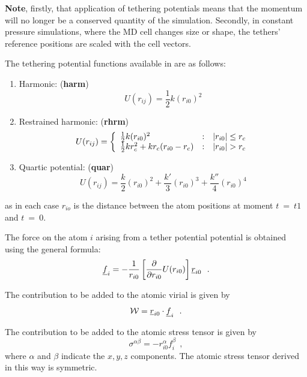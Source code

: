 {\bf Note}, firstly, that application of tethering potentials means that
the momentum will no longer be a conserved quantity of the
simulation.  Secondly, in constant pressure simulations, where the
MD cell changes size or shape, the tethers' reference positions
are scaled with the cell vectors.

The tethering potential functions available in \D are as follows:
\begin{enumerate}
\item Harmonic:  ({\bf harm})
\begin{equation}
U(r_{ij}) = \frac{1}{2}k(r_{i0})^{2}
\end{equation}
\item Restrained harmonic:  ({\bf rhrm})
\begin{equation}
U(r_{ij}) = \left\{ \begin{array} {l@{\quad:\quad}l}
\frac{1}{2}k(r_{i0})^{2} & |r_{i0}| \le r_{c} \\
\frac{1}{2}kr_{c}^{2} + kr_{c}(r_{i0}-r_{c}) & |r_{i0}| > r_{c}
\end{array} \right.
\end{equation}
\item Quartic potential:  ({\bf quar})
\begin{equation}
U(r_{ij}) =
\frac{k}{2}(r_{i0})^{2}+\frac{k'}{3}(r_{i0})^{3}+\frac{k''}{4}(r_{i0})^{4}
\end{equation}
\end{enumerate}
as in each case $r_{io}$ is the distance between the atom
positions at moment $t~=~t1$ and $t~=~0$.

The force on the atom $i$ arising from a tether potential
potential is obtained using the general
formula:
\begin{equation}
\mbox{$\underline{f}$}_{i} = -\frac{1}{{r}_{i0}}\left[ \frac{\partial }{\partial
r_{i0}}U(r_{i0})\right]\mbox{$\underline{r}$}_{i0}~~.
\end{equation}

The contribution to be added to the atomic virial is given by
\begin{equation}
{\cal W} = \mbox{$\underline{r}$}_{i0} \cdot \mbox{$\underline{f}$}_{i}~~.
\end{equation}

The contribution to be added to the atomic stress tensor is given
by
\begin{equation}
\sigma^{\alpha \beta} = -r_{i0}^{\alpha} f_{i}^{\beta}~~,
\end{equation}
where $\alpha$ and $\beta$ indicate the $x,y,z$ components.  The
atomic stress tensor derived in this way is
symmetric.

